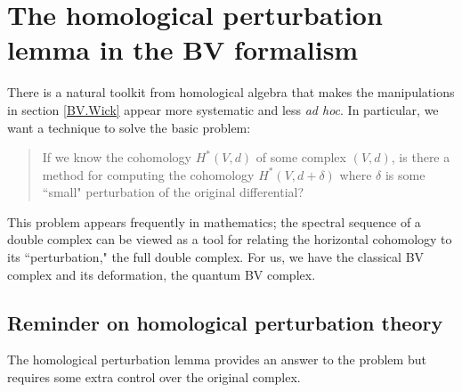 \section{The homological perturbation lemma in the BV formalism}\label{BV.HPL}

There is a natural toolkit from homological algebra that makes the manipulations in section \ref{BV.Wick} appear more systematic and less {\it ad hoc}. In particular, we want a technique to solve the basic problem:
\begin{quote}
If we know the cohomology $H^*(V,d)$ of some complex $(V,d)$, is there a method for computing the cohomology $H^*(V, d + \delta)$ where $\delta$ is some ``small" perturbation of the original differential?
\end{quote}
This problem appears frequently in mathematics; the spectral sequence of a double complex can be viewed as a tool for relating the horizontal cohomology to its ``perturbation," the full double complex. For us, we have the classical BV complex and its deformation, the quantum BV complex.

\subsection{Reminder on homological perturbation theory}

The homological perturbation lemma provides an answer to the problem but requires some extra control over the original complex.

